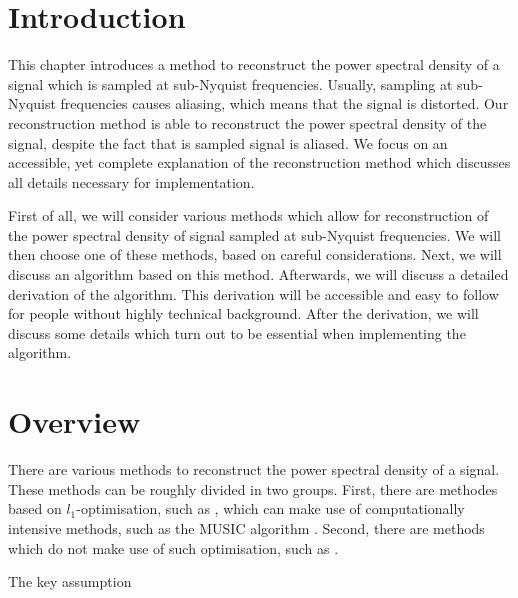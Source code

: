 \documentclass[a4paper, openany, oneside]{memoir}
\begin{document}


\section{Introduction}
This chapter introduces a method to reconstruct the power spectral density of a signal which is sampled at sub-Nyquist frequencies. Usually, sampling at sub-Nyquist frequencies causes aliasing, which means that the signal is distorted. Our reconstruction method is able to reconstruct the power spectral density of the signal, despite the fact that is sampled signal is aliased. We focus on an accessible, yet complete explanation of the reconstruction method which discusses all details necessary for implementation.

First of all, we will consider various methods which allow for reconstruction of the power spectral density of signal sampled at sub-Nyquist frequencies. We will then choose one of these methods, based on careful considerations. Next, we will discuss an algorithm based on this method. Afterwards, we will discuss a detailed derivation of the algorithm. This derivation will be accessible and easy to follow for people without highly technical background. After the derivation, we will discuss some details which turn out to be essential when implementing the algorithm.

\section{Overview}
There are various methods to reconstruct the power spectral density of a signal. These methods can be roughly divided in two groups. First, there are methodes based on $l_1$-optimisation, such as \cite{bayarkernel, candes2006robust, candes2007sparsity, candes2008introduction, kirolos2006analog, li2014gomp, polo2009compressive}, which can make use of computationally intensive methods, such as the MUSIC algorithm \cite{pal2011coprime}. Second, there are methods which do not make use of such optimisation, such as \cite{ariananda2011multicoset,ariananda2012compressive}.

The key assumption
\end{document}
